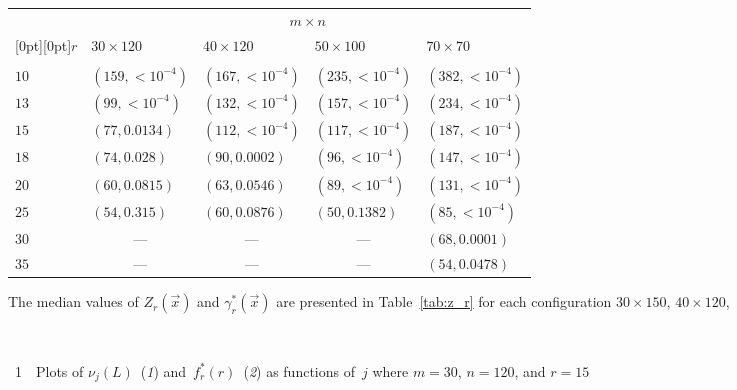 \begin{multicols}{2}
\begin{table*}
\begin{center}
    \begin{tabular}{lllll}
    \hline
    & \multicolumn{4}{c}{$m{\times}n$}\\
    \cline{2-5}
       \multicolumn{1}{c}{\raisebox{6pt}[0pt][0pt]{$r$}} & $30{\times}120$        & $40{\times}120$        & $50{\times}100$
        & $70{\times}70$ \\
        \hline
        &&&&\\[-9pt]
        $10$ & $(159, <10^{-4})$ & $(167, <10^{-4})$ & $(235, <10^{-4})$ & $(382,
        <10^{-4})$ \\
        $13$ & $(99, <10^{-4}) $ & $(132, <10^{-4})$ & $(157, <10^{-4})$ & $(234,
        <10^{-4})$ \\
        $15$ & $(77, 0.0134)$ & $(112, <10^{-4})$ & $(117, <10^{-4})$ & $(187, <10^{-4})$
        \\
        $18$ & $(74, 0.028) $ & $(90, 0.0002)$ & $(96, <10^{-4}) $ & $(147, <10^{-4})$ \\
        $20$ & $(60, 0.0815)$ & $(63, 0.0546)$ & $(89, <10^{-4}) $ & $(131, <10^{-4})$ \\
        $25$ & $(54, 0.315) $ & $(60, 0.0876)$ & $(50, 0.1382)$ & $(85, <10^{-4}) $ \\
        $30$ & \multicolumn{1}{c}{---} &\multicolumn{1}{c}{---} & \multicolumn{1}{c}{---}  & $(68, 0.0001)$ \\
        $35$ & \multicolumn{1}{c}{---} & \multicolumn{1}{c}{---}& \multicolumn{1}{c}{---} & $(54, 0.0478)$ \\
        \hline
    \end{tabular}
    \end{center}
\end{table*}

The median values of $Z_r(\vec{x})$ and $\gamma_r^*(\vec{x})$ are
presented in Table~\ref{tab:z_r} for each configuration
$30{\times}150$, $40{\times}120$,\linebreak\vspace*{-12pt}

 { \begin{center}  %
 \vspace*{-1pt}
 \mbox{%
\epsfxsize=74.714mm
}


\end{center}


\noindent
{{\figurename~1}\ \ \small{Plots of $\nu_j(L)$~(\textit{1}) and~$f_r^*(r)$~(\textit{2})
         as functions of~$j$ 
    where $m=30$, $n=120$, and $r=15$}}
}


\end{multicols}
